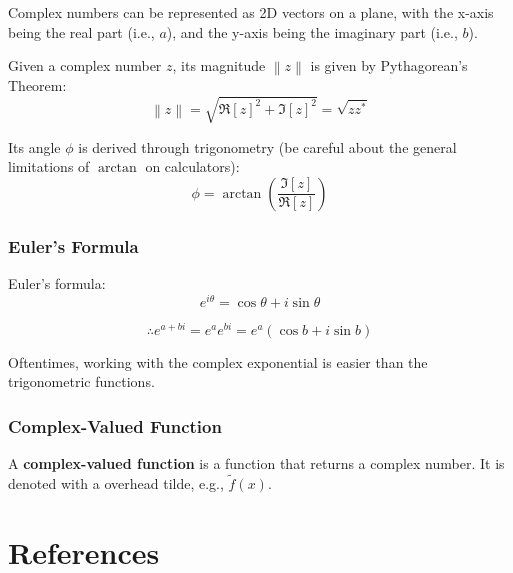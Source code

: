 \documentclass[a4paper, titlepage]{book}
\numberwithin{equation}{section}
\begin{document}
Complex numbers can be represented as 2D vectors on a plane,
with the x-axis being the real part (i.e., \(a\)),
and the y-axis being the imaginary part (i.e., \(b\)).

Given a complex number \(z\),
its magnitude \(\left\|z\right\|\) is given by Pythagorean's Theorem:
\begin{equation}
    \left\|z\right\| = \sqrt{\Re[z]^2 + \Im[z]^2} = \sqrt{z z^*}
\end{equation}

Its angle \(\phi\) is derived through trigonometry
(be careful about the general limitations of \(\arctan\) on calculators):
\begin{equation}
    \phi = \arctan\left(\frac{\Im[z]}{\Re[z]}\right)
\end{equation}

\subsection{Euler's Formula}

Euler's formula:
\begin{equation}
    e^{i \theta} = \cos\theta + i \sin\theta
\end{equation}

\begin{equation}
    \therefore e^{a + bi} = e^a e^{bi} = e^a \left(\cos b + i \sin b\right)
\end{equation}

Oftentimes, working with the complex exponential is easier than the trigonometric functions.

\subsection{Complex-Valued Function}

A \textbf{complex-valued function} is a function that returns a complex number.
It is denoted with a overhead tilde, e.g., \(\tilde{f}\left(x\right)\).

\backmatter
\chapter{References}
\end{document}
